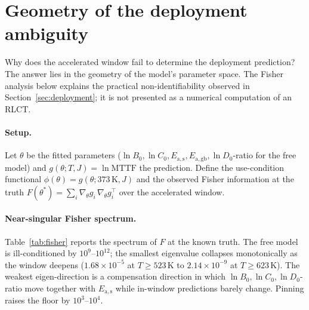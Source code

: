 \documentclass{article}
\newcommand{\MTTF}{\mathrm{MTTF}}
\begin{document}
\section{Geometry of the deployment ambiguity}
\label{sec:geometry}

Why does the accelerated window fail to determine the deployment prediction?
The answer lies in the geometry of the model's parameter space. The Fisher
analysis below explains the practical non-identifiability observed in
Section~\ref{sec:deployment}; it is not presented as a numerical computation of
an RLCT.

\paragraph{Setup.} Let $\theta$ be the fitted parameters
($\ln B_0,\ln C_0,E_{\mathrm{a,s}},E_{\mathrm{a,gb}},\ln D_{0}$-ratio for the
free model) and $g(\theta;T,J)=\ln\MTTF$ the prediction. Define the
use-condition functional $\phi(\theta)=g(\theta;373\,\mathrm{K},J)$ and the
observed Fisher information at the truth $F(\theta^*)=\sum_i
\nabla_\theta g_i\,\nabla_\theta g_i^{\top}$ over the accelerated window.

\paragraph{Near-singular Fisher spectrum.} Table~\ref{tab:fisher} reports the
spectrum of $F$ at the known truth. The free model is ill-conditioned by
$10^9$--$10^{12}$; the smallest eigenvalue collapses monotonically as the
window deepens ($1.68\times10^{-5}$ at $T\ge523$\,K to $2.14\times10^{-9}$ at
$T\ge623$\,K). The weakest eigen-direction is a compensation direction in which
$\ln B_0,\ln C_0,\ln D_{0}$-ratio move together with $E_{\mathrm{a,s}}$ while
in-window predictions barely change. Pinning raises the floor by
$10^3$--$10^4$.
\end{document}

